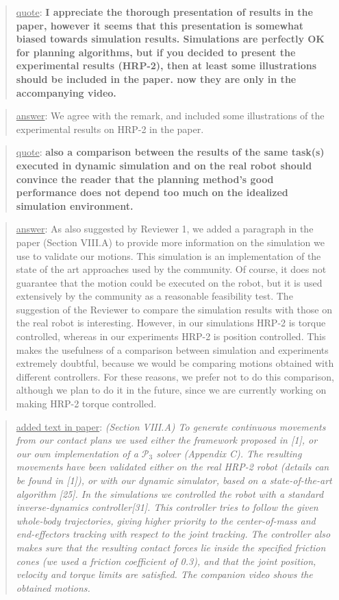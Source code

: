 \documentclass[a4paper]{article}
\newcommand{\done}[0]{}
\newcommand\quot[1]{\begin{quote} \underline{quote}: \textbf{#1}\end{quote}}
\newcommand\as[1]{\begin{quote} \underline{answer}: {#1}\end{quote} }
\newcommand\qt[1]{\begin{quote} \underline{added text in paper}: \textit{#1}\end{quote} \leavevmode \\ }
\begin{document}
\quot{I appreciate the thorough presentation of results in the paper, however
it seems that this presentation is somewhat biased towards simulation
results. Simulations are perfectly OK for planning algorithms, but if
you decided to present the experimental results (HRP-2), then at least some
illustrations should be included in the paper. now they are only in the
accompanying video.}
\as{We agree with the remark, and included some illustrations of the experimental results on HRP-2 in the paper.}

\done

 \quot{also a comparison between the results of the same
task(s) executed in dynamic simulation and on the real robot should
convince the reader that the planning method's good performance does
not depend too much on the idealized simulation environment. }
\as{As also suggested by Reviewer 1, we added a paragraph
in the paper (Section VIII.A)  to provide more information on the simulation we use to validate our motions. This simulation is an implementation of the state of the art approaches used by the community. Of course, it does not guarantee that the motion could be executed on the robot, but it is used extensively by the community as a reasonable feasibility test. The suggestion of the Reviewer to compare the simulation results with those on the real robot is interesting. However, in our simulations HRP-2 is torque controlled, whereas in our experiments HRP-2 is position controlled. This makes the usefulness of a comparison between simulation and experiments extremely doubtful, because we would be comparing motions obtained with different controllers. For these reasons, we prefer not to do this comparison, although we plan to do it in the future, since we are currently working on making HRP-2 torque controlled.}
\qt{(Section VIII.A) To generate continuous movements from our contact plans we used either the framework proposed in [1], or our own implementation of a $\mathcal{P}_3$ solver (Appendix C).
The resulting movements have been validated either on the real HRP-2 robot (details can be found in [1]), or with our dynamic simulator, based on a state-of-the-art algorithm [25].
In the simulations we controlled the robot with a standard inverse-dynamics controller[31].
This controller tries to follow the given whole-body trajectories, giving higher priority to the center-of-mass and end-effectors tracking with respect to the joint tracking.
The controller also makes sure that the resulting contact forces lie inside the specified friction cones (we used a friction coefficient of 0.3), and that the joint position, velocity and torque limits are satisfied.
The companion video shows the obtained motions.}
\end{document}
